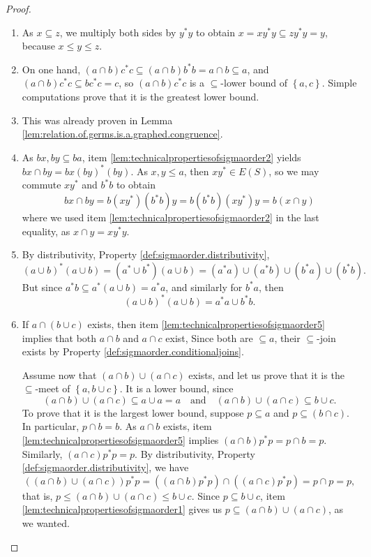 \begin{proof}
    \begin{enumerate}[label=(\alph*)]
        \item As $x\subseteq z$, we multiply both sides by $y^*y$ to obtain $x=xy^*y\subseteq zy^*y=y$, because $x\leq y\leq z$.
        \item On one hand, $(a\cap b)c^*c\subseteq (a\cap b)b^*b=a\cap b\subseteq a$, and $(a\cap b)c^*c\subseteq bc^*c=c$, so $(a\cap b)c^*c$ is a $\subseteq$-lower bound of $\left\{a,c\right\}$. Simple computations prove that it is the greatest lower bound.
        \item This was already proven in Lemma \ref{lem:relation.of.germs.is.a.graphed.congruence}.
        \item As $bx,by\subseteq ba$, item \ref{lem:technicalpropertiesofsigmaorder2} yields $bx\cap by=bx(by)^*(by)$. As $x,y\leq a$, then $xy^*\in E(S)$, so we may commute $xy^*$ and $b^*b$ to obtain
        \[bx\cap by=b(xy^*)(b^*b)y=b(b^*b)(xy^*)y=b(x\cap y)\]
        where we used item \ref{lem:technicalpropertiesofsigmaorder2} in the last equality, as $x\cap y=xy^*y$.
        
        \item By distributivity, Property \ref{def:sigmaorder.distributivity},
        \[(a\cup b)^*(a\cup b)=(a^*\cup b^*)(a\cup b)=(a^*a)\cup(a^*b)\cup(b^*a)\cup(b^*b).\]
        But since $a^*b\subseteq a^*(a\cup b)=a^*a$, and similarly for $b^*a$, then
        \[(a\cup b)^*(a\cup b)=a^*a\cup b^*b.\]
        
        \item If $a\cap(b\cup c)$ exists, then item \ref{lem:technicalpropertiesofsigmaorder5} implies that both $a\cap b$ and $a\cap c$ exist, Since both are $\subseteq a$, their $\subseteq$-join exists by Property \ref{def:sigmaorder.conditionaljoins}.
        
        Assume now that $(a\cap b)\cup(a\cap c)$ exists, and let us prove that it is the $\subseteq$-meet of $\left\{a,b\cup c\right\}$. It is a lower bound, since
        \[(a\cap b)\cup(a\cap c)\subseteq a\cup a=a\quad\text{and}\quad (a\cap b)\cup(a\cap c)\subseteq b\cup c.\]
        To prove that it is the largest lower bound, suppose $p\subseteq a$ and $p\subseteq (b\cap c)$. In particular, $p\cap b=b$. As $a\cap b$ exists, item \ref{lem:technicalpropertiesofsigmaorder5} implies $(a\cap b)p^*p=p\cap b=p$. Similarly, $(a\cap c)p^*p=p$. By distributivity, Property \ref{def:sigmaorder.distributivity}, we have
        \[((a\cap b)\cup(a\cap c))p^*p=((a\cap b)p^*p)\cap ((a\cap c)p^*p)=p\cap p=p,\]
        that is, $p\leq(a\cap b)\cup(a\cap c)\leq b\cup c$. Since $p\subseteq b\cup c$, item \ref{lem:technicalpropertiesofsigmaorder1} gives us $p\subseteq (a\cap b)\cup(a\cap c)$, as we wanted.
        

\end{enumerate}
\end{proof}
